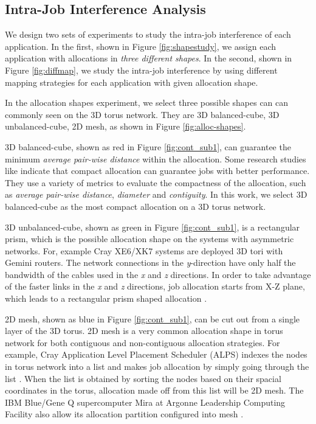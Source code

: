 \documentclass[conference]{IEEEtran}
\begin{document}
\subsection{Intra-Job Interference Analysis}
\label{sec: introjob}

We design two sets of experiments to study the intra-job interference of each application. In the first, shown in Figure \ref{fig:shapestudy}, we assign each application with allocations in \emph{three different shapes}.  In the second, shown in Figure \ref{fig:diffmap}, we study the intra-job interference by using different mapping strategies for each application with given allocation shape. 

In the allocation shapes experiment, we select three possible shapes can can commonly seen on the 3D torus network. They are 3D balanced-cube, 3D unbalanced-cube, 2D mesh, as shown in Figure \ref{fig:alloc-shapes}.

3D balanced-cube, shown as red in Figure \ref{fig:cont_sub1}, can guarantee the minimum \emph{average pair-wise distance} within the allocation. Some research studies like \cite{leung,abhinav-sc13} indicate that compact allocation can guarantee jobs with better performance. They use a variety of metrics to evaluate the compactness of the allocation, such as \emph{average pair-wise distance}, \emph{diameter} and \emph{contiguity}. In this work, we select 3D balanced-cube as the most compact allocation on a 3D torus network.

3D unbalanced-cube, shown as green in Figure \ref{fig:cont_sub1}, is a rectangular prism, which is the possible allocation shape on the systems with asymmetric networks. For, example Cray XE6/XK7 systems are deployed 3D tori with Gemini routers. The network connections in the \emph{y}-direction have only half the bandwidth of the cables used in the \emph{x} and \emph{z} directions. In order to take advantage of the faster links in the \emph{x} and \emph{z} directions, job allocation starts from X-Z plane, which leads to a rectangular prism shaped allocation \cite{RF}.

2D mesh, shown as blue in Figure \ref{fig:cont_sub1}, can be cut out from a single layer of the 3D torus. 2D mesh is a very common allocation shape in torus network for both contiguous and non-contiguous allocation strategies. For example, Cray Application Level Placement Scheduler (ALPS) indexes the nodes in torus network into a list and makes job allocation by simply going through the list \cite{carl-cug}. When the list is obtained by sorting the nodes based on their spacial coordinates in the torus, allocation made off from this list will be 2D mesh. The IBM Blue/Gene Q supercomputer Mira at Argonne Leadership Computing Facility also allow its allocation partition configured into mesh \cite{zhou-ipdps}. 
\end{document}
